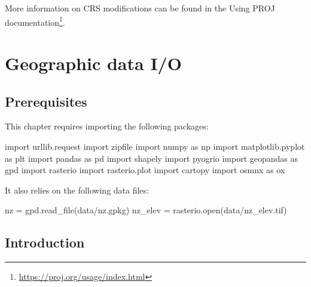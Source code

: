 \documentclass[
  letterpaper,
]{krantz}
\newenvironment{Shaded}{\begin{snugshade}}{\end{snugshade}}
\newcommand{\BuiltInTok}[1]{\textcolor[rgb]{0.00,0.23,0.31}{#1}}
\newcommand{\ImportTok}[1]{\textcolor[rgb]{0.00,0.46,0.62}{#1}}
\newcommand{\NormalTok}[1]{\textcolor[rgb]{0.00,0.23,0.31}{#1}}
\newcommand{\OperatorTok}[1]{\textcolor[rgb]{0.37,0.37,0.37}{#1}}
\newcommand{\StringTok}[1]{\textcolor[rgb]{0.13,0.47,0.30}{#1}}
\begin{document}
More information on CRS modifications can be found in the Using PROJ
documentation\footnote{\url{https://proj.org/usage/index.html}}.


\chapter{Geographic data I/O}\label{sec-read-write}

\section*{Prerequisites}\label{prerequisites-6}


This chapter requires importing the following packages:

\begin{Shaded}
\begin{Highlighting}[]
\ImportTok{import}\NormalTok{ urllib.request}
\ImportTok{import}\NormalTok{ zipfile}
\ImportTok{import}\NormalTok{ numpy }\ImportTok{as}\NormalTok{ np}
\ImportTok{import}\NormalTok{ matplotlib.pyplot }\ImportTok{as}\NormalTok{ plt}
\ImportTok{import}\NormalTok{ pandas }\ImportTok{as}\NormalTok{ pd}
\ImportTok{import}\NormalTok{ shapely}
\ImportTok{import}\NormalTok{ pyogrio}
\ImportTok{import}\NormalTok{ geopandas }\ImportTok{as}\NormalTok{ gpd}
\ImportTok{import}\NormalTok{ rasterio}
\ImportTok{import}\NormalTok{ rasterio.plot}
\ImportTok{import}\NormalTok{ cartopy}
\ImportTok{import}\NormalTok{ osmnx }\ImportTok{as}\NormalTok{ ox}
\end{Highlighting}
\end{Shaded}

It also relies on the following data files:

\begin{Shaded}
\begin{Highlighting}[]
\NormalTok{nz }\OperatorTok{=}\NormalTok{ gpd.read\_file(}\StringTok{\textquotesingle{}data/nz.gpkg\textquotesingle{}}\NormalTok{)}
\NormalTok{nz\_elev }\OperatorTok{=}\NormalTok{ rasterio.}\BuiltInTok{open}\NormalTok{(}\StringTok{\textquotesingle{}data/nz\_elev.tif\textquotesingle{}}\NormalTok{)}
\end{Highlighting}
\end{Shaded}

\section{Introduction}\label{introduction-6}
\end{document}
